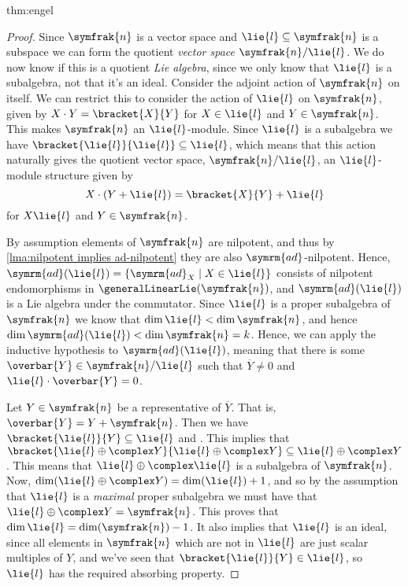 \documentclass[fleqn]{NotesClass}
\newcommand{\ad}{\symrm{ad}}
\newcommand{\nilpotentLie}{\symfrak{n}}
\begin{document}
\begin{thm}{}{thm:engel}
\begin{proof}
            Since \(\nilpotentLie\) is a vector space and \(\lie{l} \subseteq \nilpotentLie\) is a subspace we can form the quotient \emph{vector space} \(\nilpotentLie/\lie{l}\).
            We do now know if this is a quotient \emph{Lie algebra}, since we only know that \(\lie{l}\) is a subalgebra, not that it's an ideal.
            Consider the adjoint action of \(\nilpotentLie\) on itself.
            We can restrict this to consider the action of \(\lie{l}\) on \(\nilpotentLie\), given by \(X \cdot Y = \bracket{X}{Y}\) for \(X \in \lie{l}\) and \(Y \in \nilpotentLie\).
            This makes \(\nilpotentLie\) an \(\lie{l}\)-module.
            Since \(\lie{l}\) is a subalgebra we have \(\bracket{\lie{l}}{\lie{l}} \subseteq \lie{l}\), which means that this action naturally gives the quotient vector space, \(\nilpotentLie/\lie{l}\), an \(\lie{l}\)-module structure given by
            \begin{equation}
                X \cdot (Y + \lie{l}) = \bracket{X}{Y} + \lie{l}
            \end{equation}
            for \(X \lie{l}\) and \(Y \in \nilpotentLie\).
            
            By assumption elements of \(\nilpotentLie\) are nilpotent, and thus by \cref{lma:nilpotent implies ad-nilpotent} they are also \(\ad\)-nilpotent.
            Hence, \(\ad(\lie{l}) = \{\ad_X \mid X \in \lie{l}\}\) consists of nilpotent endomorphisms in \(\generalLinearLie(\nilpotentLie)\), and \(\ad(\lie{l})\) is a Lie algebra under the commutator.
            Since \(\lie{l}\) is a proper subalgebra of \(\nilpotentLie\) we know that \(\dim \lie{l} < \dim \nilpotentLie\), and hence \(\dim \ad(\lie{l}) < \dim \nilpotentLie = k\).
            Hence, we can apply the inductive hypothesis to \(\ad(\lie{l})\), meaning that there is some \(\overbar{Y} \in \nilpotentLie/\lie{l}\) such that \(\overbar{Y} \ne 0\) and \(\lie{l} \cdot \overbar{Y} = 0\).
            
            Let \(Y \in \nilpotentLie\) be a representative of \(\overbar{Y}\).
            That is, \(\overbar{Y} = Y + \nilpotentLie\).
            Then we have \(\bracket{\lie{l}}{Y} \subseteq \lie{l}\) and \(\).
            This implies that \(\bracket{\lie{l} \oplus \complex Y}{\lie{l} \oplus \complex Y} \subseteq \lie{l} \oplus \complex Y\).
            This means that \(\lie{l} \oplus \complex \lie{l}\) is a subalgebra of \(\nilpotentLie\).
            Now, \(\dim(\lie{l} \oplus \complex Y) = \dim(\lie{l}) + 1\), and so by the assumption that \(\lie{l}\) is a \emph{maximal} proper subalgebra we must have that \(\lie{l} \oplus \complex Y = \nilpotentLie\).
            This proves that \(\dim \lie{l} = \dim(\nilpotentLie) - 1\).
            It also implies that \(\lie{l}\) is an ideal, since all elements in \(\nilpotentLie\) which are not in \(\lie{l}\) are just scalar multiples of \(Y\), and we've seen that \(\bracket{\lie{l}}{Y} \in \lie{l}\), so \(\lie{l}\) has the required absorbing property.
            

\end{proof}
\end{thm}
\end{document}
